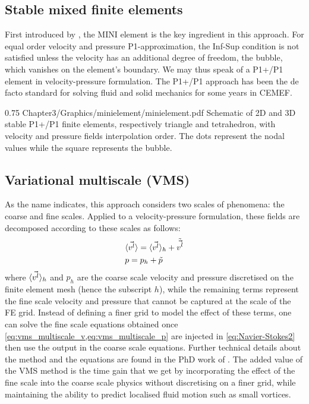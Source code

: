 \subsection{Stable mixed finite elements}
First introduced by \citet{arnold_stable_1984}, the MINI element is the key ingredient in this approach.
For equal order velocity and pressure P1-approximation, the Inf-Sup condition is not satisfied unless the velocity
has an additional degree of freedom, the bubble, which vanishes on the element's boundary. We may thus speak of a
P1+/P1 element in velocity-pressure formulation. The P1+/P1 approach has been the de facto standard for solving fluid 
and solid mechanics for some years in CEMEF.
%
\begin{figureth}
{0.75}
{Chapter3/Graphics/minielement/minielement.pdf}
{Schematic of 2D and 3D stable P1+/P1 finite elements, respectively triangle and tetrahedron, with velocity and pressure fields interpolation order.
The dots represent the nodal values while the square represents the bubble.}
\label{fig:minielement}
\end{figureth}
%
\subsection{Variational multiscale (VMS)}
As the name indicates, this approach considers two scales of phenomena: the coarse and fine scales. Applied to a velocity-pressure
formulation, these fields are decomposed according to these scales as follows:
\begin{align}
\label{eq:vms_multiscale_v}
 &\langle \vec{v^l} \rangle = \langle \vec{v^l} \rangle_h + \tilde{\vec{v^l}} \\ 
\label{eq:vms_multiscale_p}
 &p = p_h + \tilde{p}
\end{align}
where $\langle \vec{v^l} \rangle_h$ and $p_h$ are the coarse scale velocity and pressure discretised on the finite element mesh (hence the subscript $h$), 
while the remaining terms represent the fine scale velocity and pressure that cannot be captured at the scale of the FE grid. Instead 
of defining a finer grid to model the effect of these terms, one can solve the fine scale equations obtained once \cref{eq:vms_multiscale_v,eq:vms_multiscale_p}
are injected in \cref{eq:Navier-Stokes2} then use the output in the coarse scale equations. Further technical details about the method and the equations are
found in the PhD work of \citet{hachem_stabilized_2009}. The added value of the VMS method is the time gain that we get by incorporating the effect of the fine scale into the 
coarse scale physics without discretising on a finer grid, while maintaining the ability to predict localised fluid motion such as small vortices.
%
%
